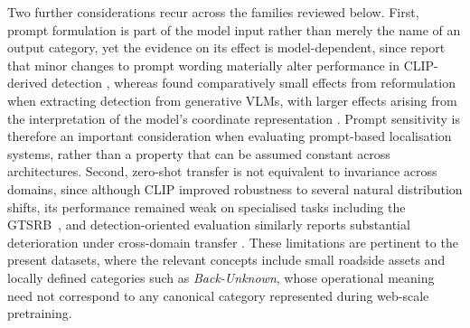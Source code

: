 Two further considerations recur across the families reviewed below. First, prompt formulation is part of the model input rather than merely the name of an output category, yet the evidence on its effect is model-dependent, since \citeauthor{du2022detpro} report that minor changes to prompt wording materially alter performance in \gls{CLIP}-derived detection \cite{du2022detpro}, whereas \citeauthor{bulzan2026unlocking} found comparatively small effects from reformulation when extracting detection from generative \glspl{VLM}, with larger effects arising from the interpretation of the model's coordinate representation \cite{bulzan2026unlocking}. Prompt sensitivity is therefore an important consideration when evaluating prompt-based localisation systems, rather than a property that can be assumed constant across architectures. Second, zero-shot transfer is not equivalent to invariance across domains, since although \gls{CLIP} improved robustness to several natural distribution shifts, its performance remained weak on specialised tasks including the GTSRB~\cite{stallkamp2012gtsrb, radford2021learning}, and detection-oriented evaluation similarly reports substantial deterioration under cross-domain transfer \cite{bulzan2026unlocking}. These limitations are pertinent to the present datasets, where the relevant concepts include small roadside assets and locally defined categories such as \emph{Back-Unknown}, whose operational meaning need not correspond to any canonical category represented during web-scale pretraining.

